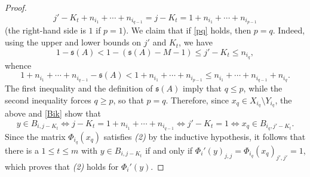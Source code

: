 \documentclass[12pt]{amsart}
\numberwithin{equation}{section}
\theoremstyle{definition}
\theoremstyle{remark}
\begin{document}
\begin{proof}
	\begin{equation}
		\label{pq}
		j'-K_{t}+n_{i_{1}}+\cdots +n_{i_{q-1}}=j-K_{t}=1+n_{i_{1}}+\cdots+ n_{i_{p-1}}
	\end{equation}
	(the right-hand side is $1$ if $p=1$). We claim that if \autoref{pq} holds, then $p=q$. Indeed, using the upper and lower bounds on $j'$ and $K_{t}$, we have
	$$
	1-\mathfrak{s}(A)< 1-(\mathfrak{s}(A)-M-1)\leq j'-K_{t}\leq n_{i_{q}},
	$$
	whence
	$$
	1+n_{i_{1}}+\cdots+n_{i_{q-1}}-\mathfrak{s}(A)<1+n_{i_{1}}+\cdots +n_{i_{p-1}}\leq n_{i_{1}}+\cdots +n_{i_{q-1}}+n_{i_{q}}.
	$$
	The first inequality and the definition of $\mathfrak{s}(A)$ imply that $q\leq p$, while the second inequality forces $q\geq p$, so that $p=q$. Therefore, since $x_{q}\in X_{i_{q}}\setminus Y_{i_{q}}$, the above and \autoref{Bik} show that
	$$
	y\in B_{i,j-K_{t}}\iff j-K_{t}=1+n_{i_{1}}+\cdots+n_{i_{q-1}}\iff j'-K_{t}=1\iff x_{q}\in B_{i_{q},j'-K_{t}}.
	$$
	Since the matrix $\Phi_{i_{q}}(x_{q})$ satisfies \textit{(2)} by the inductive hypothesis, it follows that there is a $1\leq t\leq m$ with $y\in B_{i,j-K_{t}}$ if and only if $\Phi_{i}'(y)_{j,j}=\Phi_{i_{q}}(x_{q})_{j',j'}=1$, which proves that \textit{(2)} holds for $\Phi_{i}'(y)$. 
	

\end{proof}
\end{document}
